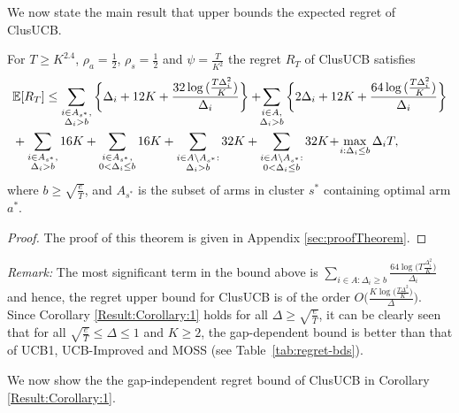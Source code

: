 	
We now state the main result that upper bounds the expected regret of ClusUCB.
\begin{theorem}
\label{Result:Theorem:1}
For $T\geq K^{2.4} $, $\rho_a =\frac{1}{2}$, $\rho_s =\frac{1}{2}$ and $\psi=\frac{T}{K^2}$ the regret $R_T$ of ClusUCB satisfies
\begin{align*}
&\mathbb{E} [R_{T}]\leq 
\sum\limits_{\substack{i\in A_{s^{*}},\\\Delta_{i} > b}}\bigg\lbrace \Delta_{i} + 12K
+ \frac{32\log{(\frac{T\Delta_i^2}{K})}}{\Delta_{i}} \bigg\rbrace
 + \! \! \sum\limits_{\substack{i\in A,\\\Delta_{i} > b}} \bigg\lbrace 2\Delta_{i} +
12K + \frac{64\log{(\frac{T\Delta_i^2}{K})}}{\Delta_{i}} \bigg\rbrace \\
&+ \sum\limits_{\substack{i\in A_{s^{*}},\\ \Delta_{i} > b}} 
16K+\sum\limits_{\substack{i\in A_{s^{*}},\\0 < \Delta_{i}\leq b}} 16K + \sum_{\substack{i\in A\setminus A_{s^*}:\\\Delta_{i}> b}}32K +\sum_{\substack{i\in A \setminus A_{s^*}:\\ 0 < \Delta_{i} \leq b}}32K 
 \!+\! \max\limits_{i:\Delta_{i}\leq b}\Delta_{i}T, 
\end{align*}
where $b\geq \sqrt{\frac{e}{T}}$, and $A_{s^{*}}$ is the subset of arms in cluster $s^{*}$ containing optimal arm $a^{*}$.
\end{theorem}
\begin{proof} The proof of this theorem is given in Appendix \ref{sec:proofTheorem}.
\end{proof}

\textit{Remark:} The most significant term in the bound above is $\sum_{i\in A:\Delta_{i}\geq b}\frac{64\log{\big(T\frac{\Delta_{i}^{2}}{K}\big)}}{\Delta_{i}}$ and hence, the regret upper bound for ClusUCB is of the order $O\bigg(\frac{K\log \big(\frac{T\Delta^{2}}{K}\big)}{\Delta}\bigg)$. Since Corollary \ref{Result:Corollary:1} holds for all $\Delta \geq \sqrt{\frac{e}{T}} $, it can be clearly seen that for all $\sqrt{\frac{e}{T}} \leq \Delta\leq 1$ and $K\geq 2$, the gap-dependent bound is better than that of UCB1, UCB-Improved and MOSS (see Table~\ref{tab:regret-bds}). 


We now show the the gap-independent regret bound of ClusUCB in Corollary \ref{Result:Corollary:1}.


